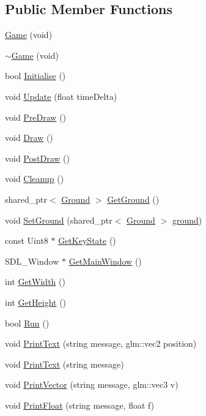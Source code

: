 \subsection*{Public Member Functions}
\begin{DoxyCompactItemize}
\item 
\hyperlink{class_b_g_e_1_1_game_a3ae96cfdab80ddfed4e942b23c59cfd9}{Game} (void)
\item 
\hyperlink{class_b_g_e_1_1_game_a5132fe2c0d2a41ad6b613dc2baeca24c}{$\sim$\-Game} (void)
\item 
bool \hyperlink{class_b_g_e_1_1_game_a2973b50f49c7906ec0e642a8753fd995}{Initialise} ()
\item 
void \hyperlink{class_b_g_e_1_1_game_a51ed573392d7bed791b67062e7c7a3d4}{Update} (float time\-Delta)
\item 
void \hyperlink{class_b_g_e_1_1_game_ab6d652246c56f49081f852557cfd0267}{Pre\-Draw} ()
\item 
void \hyperlink{class_b_g_e_1_1_game_aad2c20e2c5529244095c50c238911e30}{Draw} ()
\item 
void \hyperlink{class_b_g_e_1_1_game_ae11c57585d89d9540e6734eaee648b74}{Post\-Draw} ()
\item 
void \hyperlink{class_b_g_e_1_1_game_ac649612429b2bf532851b7f0d5a9a57c}{Cleanup} ()
\item 
shared\-\_\-ptr$<$ \hyperlink{class_b_g_e_1_1_ground}{Ground} $>$ \hyperlink{class_b_g_e_1_1_game_a38fdc20b42b4cf50e2da8fdd879bcf56}{Get\-Ground} ()
\item 
void \hyperlink{class_b_g_e_1_1_game_a6ac69a3795fe38dd4eccf4aa177d81ff}{Set\-Ground} (shared\-\_\-ptr$<$ \hyperlink{class_b_g_e_1_1_ground}{Ground} $>$ \hyperlink{class_b_g_e_1_1_game_a116334f4ca84d0941072968b941b8c39}{ground})
\item 
const Uint8 $\ast$ \hyperlink{class_b_g_e_1_1_game_a4144146a4fd89b69d32b832cef707799}{Get\-Key\-State} ()
\item 
S\-D\-L\-\_\-\-Window $\ast$ \hyperlink{class_b_g_e_1_1_game_a264d7f8fb6f690cd701f21c462530b06}{Get\-Main\-Window} ()
\item 
int \hyperlink{class_b_g_e_1_1_game_a82cfe197dfaeeb2923f0705abf76eb5c}{Get\-Width} ()
\item 
int \hyperlink{class_b_g_e_1_1_game_a0a4d07a64d1e1437b52575a6de41beda}{Get\-Height} ()
\item 
bool \hyperlink{class_b_g_e_1_1_game_a712aad58012747c8e1f0387199594910}{Run} ()
\item 
void \hyperlink{class_b_g_e_1_1_game_a68da8b79dc207e54433ae43512fbb26b}{Print\-Text} (string message, glm\-::vec2 position)
\item 
void \hyperlink{class_b_g_e_1_1_game_a5df71a1b96bf5fa2b5f4445f8ecd2145}{Print\-Text} (string message)
\item 
void \hyperlink{class_b_g_e_1_1_game_a76ccf13340bc05c787a32160eeed3a00}{Print\-Vector} (string message, glm\-::vec3 v)
\item 
void \hyperlink{class_b_g_e_1_1_game_a03e3aa6401b3e552aa4fb1f71f2852ff}{Print\-Float} (string message, float f)
\end{DoxyCompactItemize}
